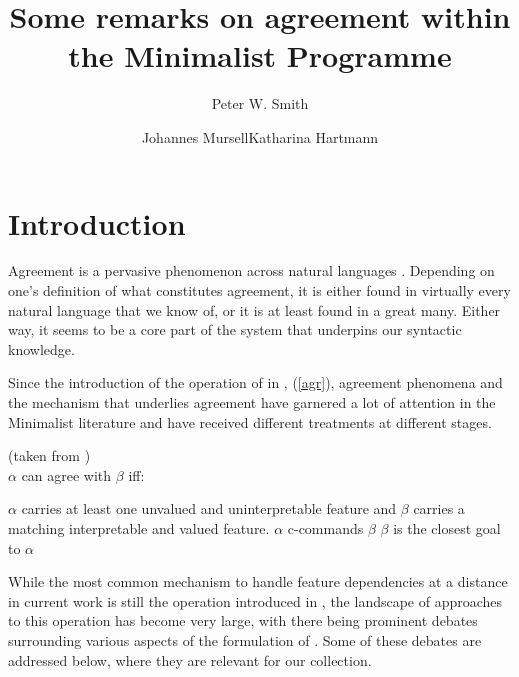 \documentclass[output=paper
,modfonts
,nonflat]{langsci/langscibook}
\title{Some remarks on agreement within the Minimalist Programme}
\author{Peter W. Smith\affiliation{Goethe-Universität Frankfurt am Main}\and Johannes Mursell\affiliation{Goethe-Universität Frankfurt am Main}\lastand Katharina Hartmann\affiliation{Goethe-Universität Frankfurt am Main}}
\begin{document}
\maketitle
\section{Introduction}
\label{secintro}

Agreement is a pervasive phenomenon across natural languages \citep{corbett2006}. Depending on one's definition of what constitutes agreement, it is either found in virtually every natural language that we know of, or it is at least found in a great many. Either way, it seems to be a core part of the system that underpins our syntactic knowledge.

Since the introduction of the operation of \agr{} in \citet{Chomsky2000}, (\ref{agr}), agreement phenomena and the mechanism that underlies agreement have garnered a lot of attention in the Minimalist literature and have received different treatments at different stages.

\begin{exe}
	\ex \agr{} (taken from \citealp{Zeijlstra2012})\\
	$\alpha$ can agree with $\beta$ iff:
	\begin{xlista}
		\ex $\alpha$ carries at least one unvalued and uninterpretable feature and $\beta$ carries a matching interpretable and valued feature.
		\ex $\alpha$ c-commands $\beta$
		\ex $\beta$ is the closest goal to $\alpha$
	\end{xlista} \label{agr}
\end{exe}
While the most common mechanism to handle feature dependencies at a distance in current work is still the operation {\agr} introduced in \citet{Chomsky2000}, the landscape of approaches to this operation has become very large, with there being prominent debates surrounding various aspects of the formulation of \agr.
Some of these debates are addressed below, where they are relevant for our collection.
\end{document}
